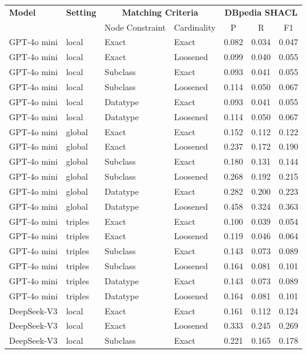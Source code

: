 \begin{table}[h]
\centering
\begin{tabular}{ll|ll|ccc}
\hline
\textbf{Model} & \textbf{Setting} & \multicolumn{2}{c|}{\textbf{Matching Criteria}} & \multicolumn{3}{c}{\textbf{DBpedia SHACL}} \\
& & Node Constraint & Cardinality & P & R & F1 \\
\hline
GPT-4o mini & local & Exact & Exact & 0.082 & 0.034 & 0.047 \\
GPT-4o mini & local & Exact & Loosened & 0.099 & 0.040 & 0.055 \\
GPT-4o mini & local & Subclass & Exact & 0.093 & 0.041 & 0.055 \\
GPT-4o mini & local & Subclass & Loosened & 0.114 & 0.050 & 0.067 \\
GPT-4o mini & local & Datatype & Exact & 0.093 & 0.041 & 0.055 \\
GPT-4o mini & local & Datatype & Loosened & 0.114 & 0.050 & 0.067 \\
GPT-4o mini & global & Exact & Exact & 0.152 & 0.112 & 0.122 \\
GPT-4o mini & global & Exact & Loosened & 0.237 & 0.172 & 0.190 \\
GPT-4o mini & global & Subclass & Exact & 0.180 & 0.131 & 0.144 \\
GPT-4o mini & global & Subclass & Loosened & 0.268 & 0.192 & 0.215 \\
GPT-4o mini & global & Datatype & Exact & 0.282 & 0.200 & 0.223 \\
GPT-4o mini & global & Datatype & Loosened & 0.458 & 0.324 & 0.363 \\
GPT-4o mini & triples & Exact & Exact & 0.100 & 0.039 & 0.054 \\
GPT-4o mini & triples & Exact & Loosened & 0.119 & 0.046 & 0.064 \\
GPT-4o mini & triples & Subclass & Exact & 0.143 & 0.073 & 0.089 \\
GPT-4o mini & triples & Subclass & Loosened & 0.164 & 0.081 & 0.101 \\
GPT-4o mini & triples & Datatype & Exact & 0.143 & 0.073 & 0.089 \\
GPT-4o mini & triples & Datatype & Loosened & 0.164 & 0.081 & 0.101 \\
\hline
DeepSeek-V3 & local & Exact & Exact & 0.161 & 0.112 & 0.124 \\
DeepSeek-V3 & local & Exact & Loosened & 0.333 & 0.245 & 0.269 \\
DeepSeek-V3 & local & Subclass & Exact & 0.221 & 0.165 & 0.178 \\

\end{tabular}
\end{table}
